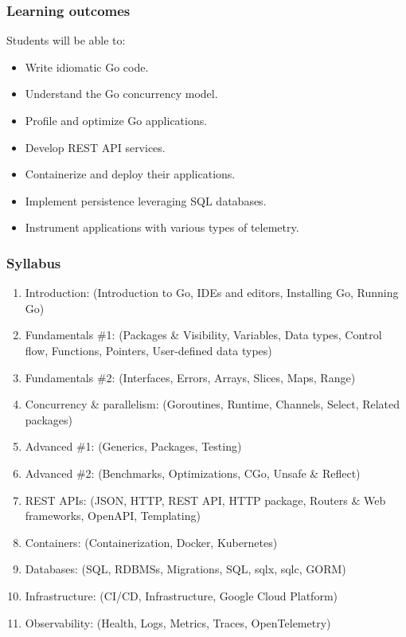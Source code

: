 \documentclass[
  digital,
  color,
  oneside,
  nosansbold,
  nocolorbold,
  nolof,
  nolot,
]{fithesis4}
\begin{document}
\subsubsection{Learning outcomes}

Students will be able to:
\begin{itemize}
    \item Write idiomatic Go code.
    \item Understand the Go concurrency model.
    \item Profile and optimize Go applications.
    \item Develop REST API services.
    \item Containerize and deploy their applications.
    \item Implement persistence leveraging SQL databases.
    \item Instrument applications with various types of telemetry.
\end{itemize}

\subsubsection{Syllabus}

\begin{enumerate}
    \item Introduction: (Introduction to Go, IDEs and editors, Installing Go, Running Go)
    \item Fundamentals \#1: (Packages \& Visibility, Variables, Data types, Control flow, Functions, Pointers, User-defined data types)
    \item Fundamentals \#2: (Interfaces, Errors, Arrays, Slices, Maps, Range)
    \item Concurrency \& parallelism: (Goroutines, Runtime, Channels, Select, Related packages)
    \item Advanced \#1: (Generics, Packages, Testing)
    \item Advanced \#2: (Benchmarks, Optimizations, CGo, Unsafe \& Reflect)
    \item REST APIs: (JSON, HTTP, REST API, HTTP package, Routers \& Web frameworks, OpenAPI, Templating)
    \item Containers: (Containerization, Docker, Kubernetes)
    \item Databases: (SQL, RDBMSs, Migrations, SQL, sqlx, sqlc, GORM)
    \item Infrastructure: (CI/CD, Infrastructure, Google Cloud Platform)
    \item Observability: (Health, Logs, Metrics, Traces, OpenTelemetry)
\end{enumerate}
\end{document}
